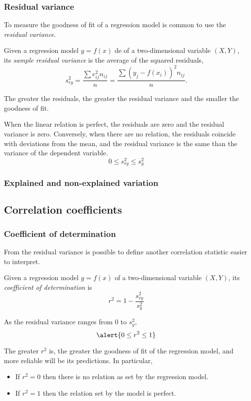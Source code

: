 \begin{frame}
\frametitle{Residual variance}
To measure the goodness of fit of a regression model is common to use the \emph{residual variance}.
\begin{definition}
Given a regression model $y=f(x)$ de of a two-dimensional variable $(X,Y)$, its \emph{sample residual variance} is the
average of the squared residuals,
\[
s_{ry}^2 = \frac{\sum e_{ij}^2n_{ij}}{n} = \frac{\sum (y_j - f(x_i))^2n_{ij}}{n}.
\]
\end{definition}

The greater the residuals, the greater the residual variance and the smaller the goodness of fit. 

When the linear relation is perfect, the residuals are zero and the residual variance is zero. 
Conversely, when there are no relation, the residuals coincide with deviations from the mean, and the residual
variance is the same than the variance of the dependent variable.
\[
0\leq s_{ry}^2\leq s_y^2
\]
\end{frame}


\begin{frame}
\frametitle{Explained and non-explained variation}
\begin{center}
\resizebox{0.9\textwidth}{!}{}
\end{center}
\end{frame}


\subsection{Correlation coefficients}
\begin{frame}
\frametitle{Coefficient of determination}
From the residual variance is possible to define another correlation statistic easier to interpret.   
\begin{definition}
Given a regression model  $y=f(x)$ of a two-dimensional variable $(X,Y)$, its \emph{coefficient of determination} is
\[
r^2 = 1- \frac{s_{ry}^2}{s_y^2}
\]
\end{definition}

As the residual variance ranges from 0 to $s_y^2$, 
\[
\alert{0\leq r^2\leq 1}
\]

The greater $r^2$ is, the greater the goodness of fit of the regression model, and more reliable will be its
predictions. 
In particular, 
\begin{itemize}
\item If $r^2 =0$ then there is no relation as set by the regression model.
\item If $r^2=1$ then the relation set by the model is perfect. 
\end{itemize}
\end{frame}


